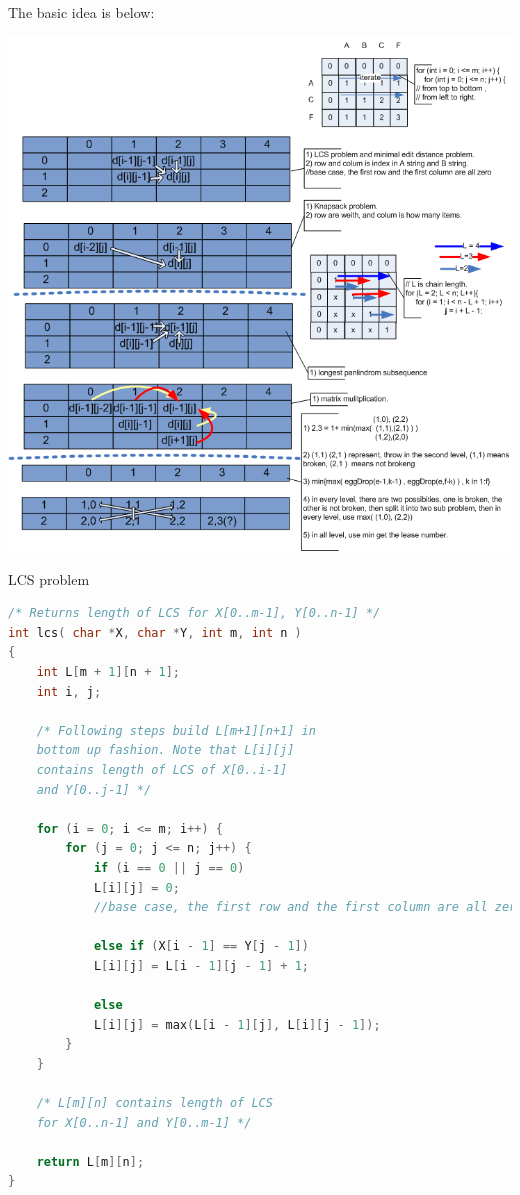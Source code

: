 \documentclass[a4paper,11pt,twoside]{book}
\begin{document}
%	
	
	
	\par The basic idea is below: 
\begin{center}
	\includegraphics[scale=0.65]{pics/two_dimension.png} 
\end{center}
	
	
	\par LCS problem 
\begin{lstlisting}[frame=single, language=c++]
/* Returns length of LCS for X[0..m-1], Y[0..n-1] */
int lcs( char *X, char *Y, int m, int n ) 
{ 
	int L[m + 1][n + 1]; 
	int i, j; 
	
	/* Following steps build L[m+1][n+1] in 
	bottom up fashion. Note that L[i][j] 
	contains length of LCS of X[0..i-1]
	and Y[0..j-1] */
	
	for (i = 0; i <= m; i++) { 
		for (j = 0; j <= n; j++) { 
			if (i == 0 || j == 0)  
			L[i][j] = 0;   
			//base case, the first row and the first column are all zero
			
			else if (X[i - 1] == Y[j - 1]) 
			L[i][j] = L[i - 1][j - 1] + 1; 
			
			else
			L[i][j] = max(L[i - 1][j], L[i][j - 1]); 
		} 
	} 
	
	/* L[m][n] contains length of LCS 
	for X[0..n-1] and Y[0..m-1] */
	
	return L[m][n]; 
} 		
\end{lstlisting}	
	
\end{document}
